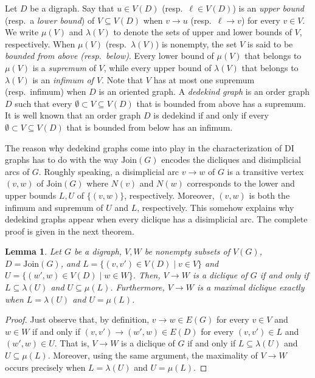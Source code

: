 \documentclass[a4paper,11pt]{article}
\newtheorem{lemma}[theorem]{Lemma}
\newcommand{\JOIN}{\ensuremath{\mathrm{Join}}}
\begin{document}
Let $D$ be a digraph.  Say that $u \in V(D)$ (resp.\ $\ell \in V(D)$) is an \emph{upper bound} (resp.\ a \emph{lower bound}) of $V \subseteq V(D)$ when $v \to u$ (resp.\ $\ell \to v$) for every $v \in V$.  We write $\mu(V)$ and $\lambda(V)$ to denote the sets of upper and lower bounds of $V$, respectively.  When $\mu(V)$ (resp.\ $\lambda(V)$) is nonempty, the set $V$ is said to be \emph{bounded from above (resp.\ below)}.  Every lower bound of $\mu(V)$ that belongs to $\mu(V)$ is a \emph{supremum} of $V$, while every upper bound of $\lambda(V)$ that belongs to $\lambda(V)$ is an \emph{infimum of $V$}.  Note that $V$ has at most one supremum (resp.\ infimum) when $D$ is an oriented graph.  A \emph{dedekind graph} is an order graph $D$ such that every $\emptyset \subset V \subseteq V(D)$ that is bounded from above has a supremum.  It is well known that an order graph $D$ is dedekind if and only if every $\emptyset \subset V \subseteq V(D)$ that is bounded from below has an infimum.

The reason why dedekind graphs come into play in the characterization of DI graphs has to do with the way $\JOIN(G)$ encodes the dicliques and disimplicial arcs of $G$.  Roughly speaking, a disimplicial arc $v \to w$ of $G$ is a transitive vertex $(v,w)$ of $\JOIN(G)$ where $N(v)$ and $N(w)$ corresponds to the lower and upper bounds $L, U$ of $\{(v,w)\}$, respectively.  Moreover, $(v,w)$ is both the infimum and supremum of $U$ and $L$, respectively.  This somehow explains why dedekind graphs appear when every diclique has a disimplicial arc.  The complete proof is given in the next theorem.  

\begin{lemma}\label{lem:dicliques in JOIN}
  Let $G$ be a digraph, $V, W$ be nonempty subsets of $V(G)$, $D = \JOIN(G)$, and $L = \{(v,v') \in V(D) \mid v \in V\}$ and $U = \{(w',w) \in V(D) \mid w \in W\}$.  Then,  $V \to W$ is a diclique of $G$ if and only if $L \subseteq \lambda(U)$ and $U \subseteq \mu(L)$.  Furthermore, $V \to W$ is a maximal diclique exactly when $L = \lambda(U)$ and $U = \mu(L)$.
\end{lemma}

\begin{proof}
  Just observe that, by definition, $v \to w \in E(G)$ for every $v \in V$ and $w \in W$ if and only if $(v, v') \to (w',w) \in E(D)$ for every $(v,v') \in L$ and $(w', w) \in U$.  That is, $V \to W$ is a diclique of $G$ if and only if $L \subseteq \lambda(U)$ and $U \subseteq \mu(L)$.  Moreover, using the same argument, the maximality of $V \to W$ occurs precisely when $L = \lambda(U)$ and $U = \mu(L)$.
\end{proof}
\end{document}
